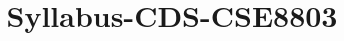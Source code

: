 \documentclass[12pt]{article}
\title{Syllabus-CDS-CSE8803}
\begin{document}
\MakeScribeTop


\end{document}
